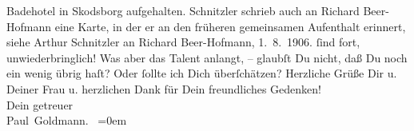 \begin{ledgroupsized}[t]{13cm}
{{{                     Badehotel in Skodsborg aufgehalten. Schnitzler schrieb auch an Richard
                     Beer-Hofmann eine Karte, in der er an den früheren gemeinsamen Aufenthalt
                  erinnert, siehe Arthur Schnitzler an Richard Beer-Hofmann, 1. 8. 1906.}}}\label{K-L03249-2h}
               ſind fort, unwiederbringlich! Was aber das Talent anlangt, – glaubſt Du nicht, daß Du
               noch ein wenig übrig haſt? Oder ſollte ich Dich überſchätzen?\pend
           \pstart
           Herzliche Grüße Dir u. Deiner Frau u. herzlichen Dank für Dein freundliches Gedenken! {\\[\baselineskip]}Dein getreuer
                  {\\[\baselineskip]}\spacefill\mbox{Paul Goldmann. }\pend
           \leftskip=0em{}
         
         \endnumbering{}\end{ledgroupsized}\begin{anhang}\end{anhang}\newcommand{\dateiname}{L03249}\newcommand{\titel}{Paul Goldmann an Arthur Schnitzler, 3. 8. 1906}\newcommand{\editorInnen}{Martin Anton Müller und Laura Untner}
      